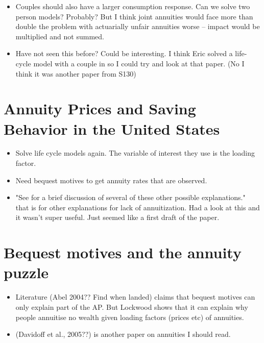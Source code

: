 \documentclass[12pt]{article}
\begin{document}
\begin{itemize}
    \item Couples should also have a larger consumption response. Can we solve
          two person models? Probably? But I think joint annuities would face
          more than double the problem with actuarially unfair annuities worse --
          impact would be multiplied and not summed.

    \item Have not seen this before? Could be interesting. I think Eric solved a life-cycle model
          with a couple in so I could try and look at that paper. (No I think it was another paper from S130)

\end{itemize}

\section{Annuity Prices and Saving Behavior in the United States}
\begin{itemize}
    \item Solve life cycle models again. The variable of interest they use is the
          loading factor.

    \item Need bequest motives to get annuity rates that are observed.
    \item "See \cite{friedman_warshawsky_nber_1985} for a brief discussion of several
          of these other possible explanations." that is for other explanations for
          lack of annuitization. Had a look at this and it wasn't super useful. Just
          seemed like a first draft of the paper.



\end{itemize}


\section{Bequest motives and the annuity puzzle}
\begin{itemize}
    \item Literature (Abel 2004?? Find when landed) claims that bequest motives
          can only explain part of the AP. But Lockwood shows that it can explain why people
          annuitise no wealth given loading factors (prices etc) of annuities.

    \item  (Davidoff et al., 2005??) is another paper on annuities I should read.


\end{itemize}
\end{document}
